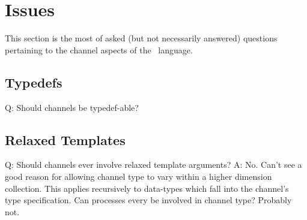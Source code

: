 \section{Issues}
\label{sec:channels:issues}

This section is the most of asked (but not necessarily answered) questions
pertaining to the channel aspects of the \hac\ language.  

\subsection{Typedefs}
\label{sec:channels:typedefs}

Q: Should channels be typedef-able?

\subsection{Relaxed Templates}
\label{sec:channels:relaxed_templates}

Q: Should channels ever involve relaxed template arguments?
A: No.  Can't see a good reason for allowing channel type to vary
	within a higher dimension collection.  This applies recursively
	to data-types which fall into the channel's type specification.  
	Can processes every be involved in channel type?  Probably not.  

